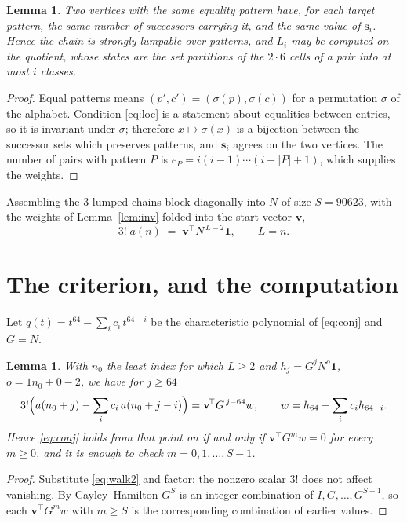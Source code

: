 \documentclass[11pt,a4paper]{article}
\theoremstyle{plain}
\newtheorem{lemma}[theorem]{Lemma}
\theoremstyle{definition}
\begin{document}
\begin{lemma}\label{lem:lump}
Two vertices with the same equality pattern have, for each target pattern, the same number of
successors carrying it, and the same value of $\mathbf{s}_i$. Hence the chain is strongly
lumpable over patterns, and $L_i$ may be computed on the quotient, whose states are the set
partitions of the $2\cdot6$ cells of a pair into at most $i$ classes.
\end{lemma}

\begin{proof}
Equal patterns means $(p',c')=(\sigma(p),\sigma(c))$ for a permutation $\sigma$ of the
alphabet. Condition \eqref{eq:loc} is a statement about equalities between entries, so it is
invariant under $\sigma$; therefore $x\mapsto\sigma(x)$ is a bijection between the successor
sets which preserves patterns, and $\mathbf{s}_i$ agrees on the two vertices. The number of
pairs with pattern $P$ is $e_P=i(i-1)\cdots(i-|P|+1)$, which supplies the weights.
\end{proof}

Assembling the $3$ lumped chains block-diagonally into $N$ of size $S=90623$, with the
weights of Lemma~\ref{lem:inv} folded into the start vector $\mathbf{v}$,
\begin{equation}\label{eq:walk2}
3!\;a(n)\;=\;\mathbf{v}^{\!\top}N^{\,L-2}\mathbf{1},\qquad L=n .
\end{equation}

\section{The criterion, and the computation}

Let $q(t)=t^{64}-\sum_i c_i\,t^{64-i}$ be the characteristic polynomial of
\eqref{eq:conj} and $G=N$.

\begin{lemma}\label{lem:crit}
With $n_0$ the least index for which $L\ge2$ and $h_j=G^{j}N^{o}\mathbf{1}$,
$o=1n_0+0-2$, we have for $j\ge64$
\[
3!\Bigl(a(n_0+j)-\sum_i c_i\,a(n_0+j-i)\Bigr)
=\mathbf{v}^{\!\top}G^{\,j-64}w,\qquad
w=h_{64}-\sum_i c_i h_{64-i} .
\]
Hence \eqref{eq:conj} holds from that point on if and only if
$\mathbf{v}^{\!\top}G^{m}w=0$ for every $m\ge0$, and it is enough to check
$m=0,1,\dots,S-1$.
\end{lemma}

\begin{proof}
Substitute \eqref{eq:walk2} and factor; the nonzero scalar $3!$ does not affect
vanishing. By Cayley--Hamilton $G^{S}$ is an integer combination of $I,G,\dots,G^{S-1}$,
so each $\mathbf{v}^{\!\top}G^{m}w$ with $m\ge S$ is the corresponding combination of
earlier values.
\end{proof}
\end{document}
